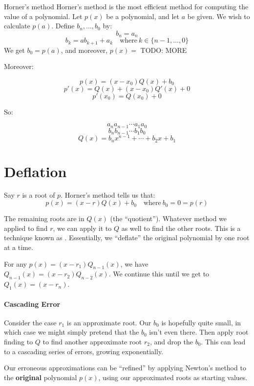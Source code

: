 \begin{tecbox}{Horner's method}{}
    Horner's method is the most efficient method for computing the value of a polynomial. Let $p(x)$ be a polynomial, and let $a$ be given. We wish to calculate $p(a)$. Define $b_n, \ldots, b_0$ by:
    \[ b_n = a_n \]
    \[ b_k = ab_{k+1} + a_k \quad \text{where}\ k \in \{n-1, \ldots, 0\} \]
    We get $b_0 = p(a)$, and moreover, $p(x) = $ TODO: MORE
\end{tecbox}


Moreover:

\[ p(x) = (x - x_0)Q(x) + b_0 \]
\[ p\prime(x) = Q(x) + (x - x_0)Q\prime(x) + 0\]
\[ p\prime(x_0) = Q(x_0) + 0 \]

So:

\[ a_n a_{n-1} \cdots a_1 a_0 \]
\[ b_n b_{n-1} \cdots b_1 b_0 \]
\[ Q(x) = b_n x^{n-1} + \cdots + b_2 x + b_1  \]

\section{Deflation}
Say $r$ is a root of $p$. Horner's method tells us that:
\[ p(x) = (x - r) Q(x) + b_0 \quad \text{where}\ b_0 = 0 = p(r) \]

The remaining roots are in $Q(x)$ (the ``quotient''). Whatever method we applied to find $r$, we can apply it to $Q$ as well to find the other roots. This is a technique known as . Essentially, we ``deflate'' the original polynomial by one root at a time.

For any $p(x) = (x - r_1) Q_{n-1}(x)$, we have $Q_{n-1}(x) = (x - r_2) Q_{n-2}(x)$. We continue this until we get to $Q_1(x) = (x - r_n)$.


\paragraph{Cascading Error}
Consider the case $r_1$ is an approximate root. Our $b_0$ is hopefully quite small, in which case we might simply pretend that the $b_0$ isn't even there. Then apply root finding to $Q$ to find another approximate root $r_2$, and drop the $b_0$. This can lead to a cascading series of errors, growing exponentially.

Our erroneous approximations can be ``refined'' by applying Newton's method to the \textbf{original} polynomial $p(x)$, using our approximated roots as starting values.

